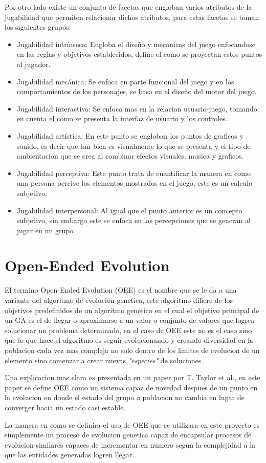 Por otro lado existe un conjunto de facetas que engloban varios atributos de la
jugabilidad que permiten relacionar dichos atributos, para estas facetas se
toman los siguientes grupos:

\begin{itemize}
    \item Jugabilidad intrínseca: Engloba el diseño y mecanicas del juego
    enfocandose en las reglas y objetivos establecidos, define el como se
    proyectan estos puntos al jugador.
    \item Jugabilidad mecánica: Se enfoca en parte funcional del juego y en los
    comportamientos de los personajes, se basa en el diseño del motor del juego.
    \item Jugabilidad interactiva: Se enfoca mas en la relacion usuario-juego,
    tomando en cuenta el como se presenta la interfaz de usuario y los controles.
    \item Jugabilidad artística: En este punto se engloban los puntos de
    graficos y sonido, es decir que tan bien es visualmente lo que se presenta y
    el tipo de ambientacion que se crea al combinar efectos visuales, musica y graficos.
    \item Jugabilidad perceptiva: Este punto trata de cuantificar la manera en
    como una persona percive los elementos mostrados en el juego, este es un
    calculo subjetivo.
    \item Jugabilidad interpersonal: Al igual que el punto anterior es un
    concepto subjetivo, sin embargo este se enfoca en las percepciones que se
    generan al jugar en un grupo.
\end{itemize}

\section{Open-Ended Evolution}
\label{section:open-ended_Evolution}

El termino Open-Ended Evolution (OEE) es el nombre que se le da a una variante
del algoritmo de evolucion genetica, este algoritmo difiere de los objetivos
predefinidos de un algoritmo genetico en el cual el objetivo principal de un GA
es el de llegar o aproximarse a un valor o conjunto de valores que logren
solucionar un problema determinado, en el caso de OEE este no es el caso sino
que lo que hace el algoritmo es seguir evolucionando y creando diversidad en la
poblacion cada vez mas compleja no solo dentro de los limites de evolucion de un
elemento sino comenzar a crear nuevas \textit{"especies"} de soluciones.

Una explicacion mas clara es presentada en un paper por T. Taylor et
al.\cite{Taylor2016}, en este paper se define OEE como un sistema capaz de
novedad despues de un punto en la evolucion en donde el estado del grupo o
poblacion no cambia en lugar de converger hacia un estado casi estable.

La manera en como se definira el uso de OEE que se utilizara en este proyecto es
simplemente un proceso de evolucion genetica capaz de encapsular procesos de
evolucion similares capaces de incrementar en numero segun la complejidad a la que
las entidades generadas logren llegar.